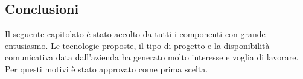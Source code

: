 \subsection{Conclusioni}
Il seguente capitolato è stato accolto da tutti i componenti con grande entusiasmo. Le tecnologie proposte, il tipo di progetto e la disponibilità comunicativa data dall'azienda ha generato molto interesse e voglia di lavorare. Per questi motivi è stato approvato come prima scelta.
